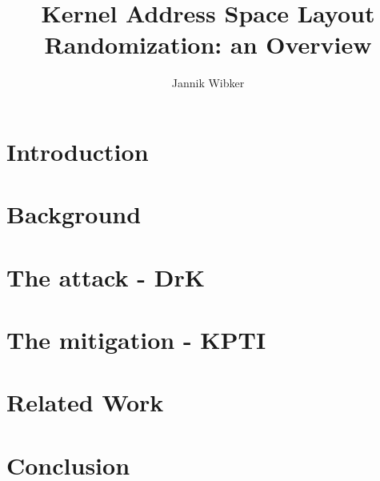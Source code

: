 \documentclass[10pt,twocolumn,a4paper]{article}
\author{Jannik Wibker}
\begin{document}
\title{ Kernel Address Space Layout Randomization: an Overview }

\newcommand{\todo}[1]{{\texttt{[#1]}}}
\newcommand{\code}[1]{{\tt \small{#1}}}

\maketitle

\begin{abstract}

\end{abstract}

\section{Introduction}\label{sec:introduction}



\section{Background}\label{sec:background}



\section{The attack - DrK}\label{sec:drk}



\section{The mitigation - KPTI}\label{sec:kpti}



\section{Related Work}\label{sec:relwork}



\section{Conclusion}\label{sec:conclusion}





\end{document}
